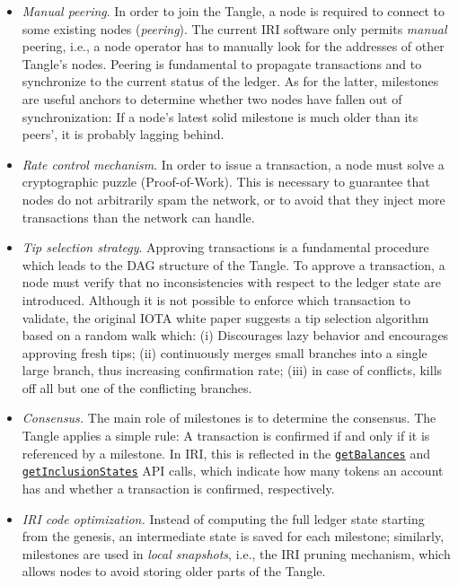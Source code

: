 \documentclass[../main.tex]{subfiles}
\begin{document}
\begin{itemize}
	
	\item \textit{Manual peering}. In order to join the Tangle, a node is required to connect to some existing nodes (\textit{peering}). The current IRI software only permits \textit{manual} peering, i.e., a node operator has to manually look for the addresses of other Tangle's nodes. Peering is fundamental to propagate transactions and to synchronize to the current status of the ledger. As for the latter, milestones are useful anchors to determine whether two nodes have fallen out of synchronization: If a node’s latest solid milestone is much older than its peers', it is probably lagging behind.
	
	\item \textit{Rate control mechanism}. In order to issue a transaction, a node must solve a cryptographic puzzle (Proof-of-Work). This is necessary to guarantee that nodes do not arbitrarily spam the network, or to avoid that they inject more transactions than the network can handle.
	
	\item \textit{Tip selection strategy}. Approving transactions is a fundamental procedure which leads to the DAG structure of the Tangle. To approve a transaction, a node must verify that no inconsistencies with respect to the ledger state are introduced. Although it is not possible to enforce which transaction to validate, the original IOTA white paper suggests a tip selection algorithm based on a random walk which: (i) Discourages lazy behavior and encourages approving fresh tips; (ii) continuously merges small branches into a single large branch, thus increasing confirmation rate; (iii) in case of conflicts, kills off all but one of the conflicting branches.%
	
	\item \textit{Consensus.} The main role of milestones is to determine the consensus. The Tangle applies a simple rule: A transaction is confirmed if and only if it is referenced by a milestone. In IRI, this is reflected in the \href{https://docs.iota.org/docs/iri/0.1/references/api-reference\#getbalances}{\texttt{getBalances}} and \href{https://docs.iota.org/docs/iri/0.1/references/api-reference\#getinclusionstates}{\texttt{getInclusionStates}} API calls, which indicate how many tokens an account has and whether a transaction is confirmed, respectively.
	
	\item \textit{IRI code optimization.} Instead of computing the full ledger state starting from the genesis, an intermediate state is saved for each milestone; similarly, milestones are used in \textit{local snapshots}, i.e., the IRI pruning mechanism, which allows nodes to avoid storing older parts of the Tangle.
	
\end{itemize}
\end{document}
